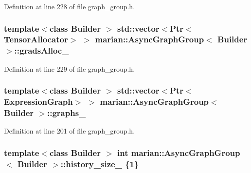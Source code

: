 Definition at line 228 of file graph\+\_\+group.\+h.

\subsubsection[{\texorpdfstring{grads\+Alloc\+\_\+}{gradsAlloc_}}]{\setlength{\rightskip}{0pt plus 5cm}template$<$class Builder $>$ std\+::vector$<${\bf Ptr}$<${\bf Tensor\+Allocator}$>$ $>$ {\bf marian\+::\+Async\+Graph\+Group}$<$ Builder $>$\+::grads\+Alloc\+\_\+\hspace{0.3cm}{\ttfamily [private]}}\hypertarget{classmarian_1_1AsyncGraphGroup_a0701944b0307c81dd518f57e452f2de6}{}\label{classmarian_1_1AsyncGraphGroup_a0701944b0307c81dd518f57e452f2de6}


Definition at line 229 of file graph\+\_\+group.\+h.

\subsubsection[{\texorpdfstring{graphs\+\_\+}{graphs_}}]{\setlength{\rightskip}{0pt plus 5cm}template$<$class Builder $>$ std\+::vector$<${\bf Ptr}$<${\bf Expression\+Graph}$>$ $>$ {\bf marian\+::\+Async\+Graph\+Group}$<$ Builder $>$\+::graphs\+\_\+\hspace{0.3cm}{\ttfamily [private]}}\hypertarget{classmarian_1_1AsyncGraphGroup_a3fbad41763c988a5723a39c2220287d8}{}\label{classmarian_1_1AsyncGraphGroup_a3fbad41763c988a5723a39c2220287d8}


Definition at line 201 of file graph\+\_\+group.\+h.

\subsubsection[{\texorpdfstring{history\+\_\+size\+\_\+}{history_size_}}]{\setlength{\rightskip}{0pt plus 5cm}template$<$class Builder $>$ int {\bf marian\+::\+Async\+Graph\+Group}$<$ Builder $>$\+::history\+\_\+size\+\_\+ \{1\}\hspace{0.3cm}{\ttfamily [private]}}\hypertarget{classmarian_1_1AsyncGraphGroup_a0958c1384fc7486dd4f739d69c9ac636}{}\label{classmarian_1_1AsyncGraphGroup_a0958c1384fc7486dd4f739d69c9ac636}


